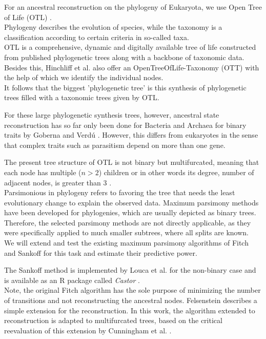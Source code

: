   For an ancestral reconstruction on the phylogeny of Eukaryota, we use Open Tree of Life (OTL) 
    \cite{Hinchliff2015}. \\
  Phylogeny describes the evolution of species, while the taxonomy is a classification according to 
    certain criteria in so-called taxa. \\
  OTL is a comprehensive, dynamic and digitally available tree of life constructed from published 
    phylogenetic trees along with a backbone of taxonomic data. Besides this, Hinchliff et al. also 
    offer an OpenTreeOfLife-Taxonomy (OTT) with the help of which we identify the individual nodes. \\
  It follows that the biggest 'phylogenetic tree' is this synthesis of phylogenetic trees filled 
    with a taxonomic trees given by OTL.

  For these large phylogenetic synthesis trees, however, ancestral state reconstruction has so far 
    only been done for Bacteria and Archaea for binary traits by Goberna and Verdú \cite{Goberna2015}.
    However, this differs from eukaryotes in the sense that complex traits such as parasitism depend
    on more than one gene.

  The present tree structure of OTL is not binary but multifurcated, meaning that each node has
    multiple ($n > 2$) children or in other words its degree, number of adjacent nodes, is greater 
    than 3 \cite{Felsenstein2003}. \\
  Parsimonious in phylogeny refers to favoring the tree that needs the least evolutionary change to 
    explain the observed data. Maximum parsimony methods have been developed for phylogenies, which 
    are usually depicted as binary trees. Therefore, the selected parsimony methods are not directly 
    applicable, as they were specifically applied to much smaller subtrees, where all splits are 
    known. \\
  We will extend and test the existing maximum parsimony algorithms of Fitch \cite{Fitch1971} and 
    Sankoff \cite{Sankoff1975} for this task and estimate their predictive power. 

  The Sankoff method is implemented by Louca et al. for the non-binary case and is available as an R 
    package called \textit{Castor} \cite{Louca2017}. \\
  Note, the original Fitch algorithm has the sole purpose of minimizing the number of transitions 
    and not reconstructing the ancestral nodes. Felsenstein \cite{Felsenstein2003} describes a 
    simple extension for the reconstruction. In this work, the algorithm extended to reconstruction 
    is adapted to multifurcated trees, based on the critical reevaluation of this extension by 
    Cunningham et al. \cite{Cunningham1998}.  

